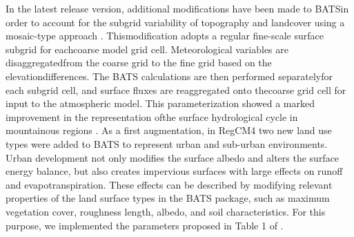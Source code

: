 In the latest release version, additional modifications have been made to
\ac{BATS}in order to account for the subgrid variability of topography and
landcover using a mosaic-type approach \citep{Giorgi03b}.  Thismodification
adopts a regular fine-scale surface subgrid for eachcoarse model grid cell.
Meteorological variables are disaggregatedfrom the coarse grid to the fine
grid based on the elevationdifferences.  The \ac{BATS} calculations are then
performed separatelyfor each subgrid cell, and surface fluxes are reaggregated
onto thecoarse grid cell for input to the atmospheric model.
This parameterization showed a marked improvement in the representation ofthe
surface hydrological cycle in mountainous regions \citep{Giorgi03b}.
As a first augmentation, in \ac{RegCM4} two new land use types were added to
\ac{BATS} to represent urban and sub-urban environments. Urban development not
only modifies the surface albedo and alters the surface energy balance, but
also creates impervious surfaces with large effects on runoff and
evapotranspiration.
These effects can be described by modifying relevant properties of the land
surface types in the BATS package, such as maximum vegetation cover, roughness
length, albedo, and soil characteristics. For this purpose, we implemented the
parameters proposed in Table 1 of \cite{Kueppers_08}.

